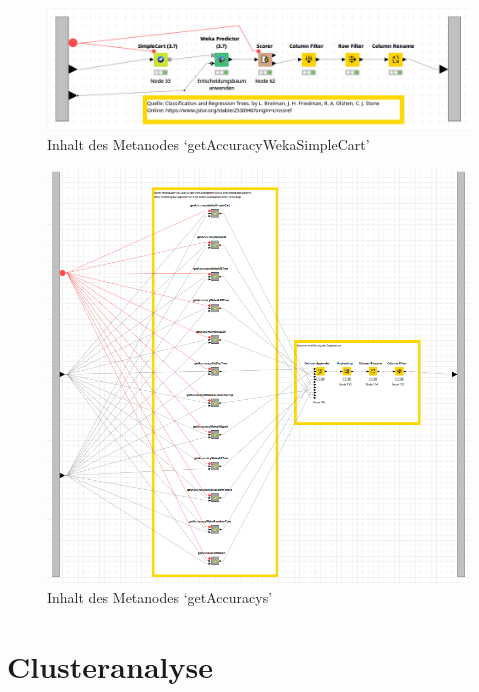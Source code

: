 \documentclass[12pt,					%
							 oneside,			%
							 a4paper,			%
							 halfparskip,		%
							 liststotoc,			%
							 bibtotoc,			%
							 fleqn,				%
							 pointlessnumbers]	%
							 {scrreprt}
\begin{document}
		\begin{figure}[h]
			\begin{center}
				\includegraphics[scale=0.35]{pictures/trees-workflow-weka-example.png}
				\caption{Inhalt des Metanodes `getAccuracyWekaSimpleCart'}									
				\label{figure:trees:workflow:example:weka}
			\end{center}
		\end{figure}
		
		\begin{figure}[h]
			\begin{center}
				\includegraphics[scale=0.55]{pictures/trees-workflow-getAccuracys.png}
				\caption{Inhalt des Metanodes `getAccuracys'}									
				\label{figure:trees:workflow:getaccuracys}
			\end{center}
		\end{figure}

	\section{Clusteranalyse}
\end{document}
